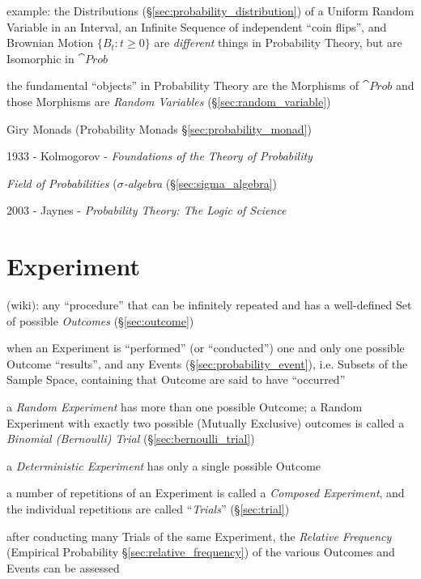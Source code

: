 example: the Distributions (\S\ref{sec:probability_distribution}) of a Uniform
Random Variable in an Interval, an Infinite Sequence of independent ``coin
flips'', and Brownian Motion $\{B_t : t \geq 0\}$ are \emph{different} things in
Probability Theory, but are Isomorphic in $\cat{Prob}$

the fundamental ``objects'' in Probability Theory are the Morphisms of
$\cat{Prob}$ and those Morphisms are \emph{Random Variables}
(\S\ref{sec:random_variable})

\fist Giry Monads (Probability Monads \S\ref{sec:probability_monad})

\asterism

1933 - Kolmogorov - \emph{Foundations of the Theory of Probability}

\emph{Field of Probabilities} (\emph{$\sigma$-algebra}
(\S\ref{sec:sigma_algebra})

\asterism

2003 - Jaynes - \emph{Probability Theory: The Logic of Science}



\section{Experiment}\label{sec:experiment}

(wiki): any ``procedure'' that can be infinitely repeated and has a well-defined
Set of possible \emph{Outcomes} (\S\ref{sec:outcome})

when an Experiment is ``performed'' (or ``conducted'') one and only one possible
Outcome ``results'', and any Events (\S\ref{sec:probability_event}), i.e.
Subsets of the Sample Space, containing that Outcome are said to have
``occurred''

a \emph{Random Experiment} has more than one possible Outcome; a Random
Experiment with exactly two possible (Mutually Exclusive) outcomes is called a
\emph{Binomial (Bernoulli) Trial} (\S\ref{sec:bernoulli_trial})

a \emph{Deterministic Experiment} has only a single possible Outcome

a number of repetitions of an Experiment is called a \emph{Composed Experiment},
and the individual repetitions are called ``\emph{Trials}'' (\S\ref{sec:trial})

after conducting many Trials of the same Experiment, the \emph{Relative
  Frequency} (Empirical Probability \S\ref{sec:relative_frequency}) of the
various Outcomes and Events can be assessed

